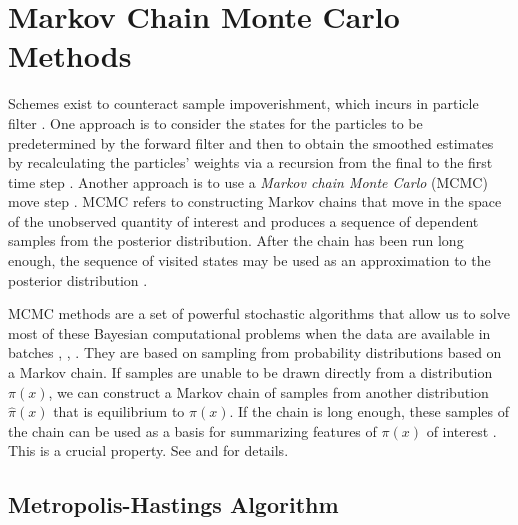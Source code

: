 \section{Markov Chain Monte Carlo Methods}


Schemes exist to counteract sample impoverishment, which incurs in particle filter \cite{ristic2004beyond}. One approach is to consider the states for the particles to be predetermined by the forward filter and then to obtain the smoothed estimates by recalculating the particles' weights via a recursion from the final to the first time step \cite{godsill2000methodology}. Another approach is to use a \textit{Markov chain Monte Carlo} (MCMC) move step \cite{carlin1992monte}. MCMC refers to constructing Markov chains that move in the space of the unobserved quantity of interest and produces a sequence of dependent samples from the posterior distribution. After the chain has been run long enough, the sequence of visited states may be used as an approximation to the posterior distribution \cite{kokkala2016particle}. 


MCMC methods are a set of powerful stochastic algorithms that allow us to solve most of these Bayesian computational problems when the data are available in batches \cite{andrieu1999sequential}, \cite{green1995reversible}, \cite{andrieu2001model}. They are based on sampling from probability distributions based on a Markov chain. If samples are unable to be drawn directly from a distribution $\pi(x)$, we can construct a Markov chain of samples from another distribution $\hat{\pi}(x)$ that is equilibrium to $\pi(x)$. If the chain is long enough, these samples of the chain can be used as a basis for summarizing features of $\pi(x)$ of interest \cite{smith1993bayesian}. This is a crucial property. See \eg \cite{cappe2009inference} and \cite{liu2008monte} for details. 




\subsection*{Metropolis-Hastings Algorithm}

